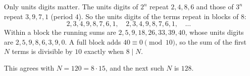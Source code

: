 Only units digits matter. The units digits of $2^n$ repeat $2,4,8,6$ and those of $3^n$ repeat $3,9,7,1$ (period $4$). So the units digits of the terms repeat in blocks of $8$:
\[2,3,4,9,8,7,6,1,\quad2,3,4,9,8,7,6,1,\quad\dots\]
Within a block the running sums are $2,5,9,18,26,33,39,40$, whose units digits are $2,5,9,8,6,3,9,0$. A full block adds $40\equiv0\pmod{10}$, so the sum of the first $N$ terms is divisible by $10$ exactly when $8\mid N$.

This agrees with $N=120=8\cdot15$, and the next such $N$ is $\boxed{128}$.
